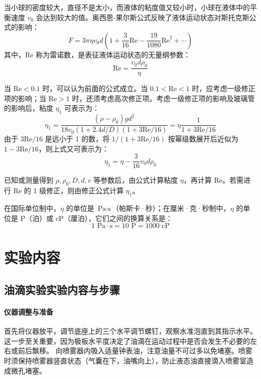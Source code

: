 \documentclass[11pt]{article}
\begin{document}
当小球的密度较大，直径不是太小，而液体的粘度值又较小时，小球在液体中的平衡速度 $v_0$ 会达到较大的值。奥西恩-果尔斯公式反映了液体运动状态对斯托克斯公式的影响：
\begin{equation}
    F = 3\pi\eta v_0 d \left( 1 + \frac{3}{16}\text{Re} - \frac{19}{1080}\text{Re}^2 + \cdots \right)
\end{equation}
其中，$\text{Re}$ 称为雷诺数，是表征液体运动状态的无量纲参数：
\begin{equation}
    \text{Re} = \frac{v_0 d \rho_0}{\eta}
\end{equation}

当 $\text{Re} < 0.1$ 时，可以认为前面的公式成立。当 $0.1 < \text{Re} < 1$ 时，应考虑一级修正项的影响；当 $\text{Re} > 1$ 时，还须考虑高次修正项。考虑一级修正项的影响及玻璃管的影响后，粘度 $\eta_1$ 可表示为：
\begin{equation}
    \eta_1 = \frac{(\rho - \rho_0)gd^2}{18v_0(1 + 2.4d/D)(1 + 3\text{Re}/16)} = \eta \frac{1}{1 + 3\text{Re}/16}
\end{equation}
由于 $3\text{Re}/16$ 是远小于 1 的数，将 $1 / (1 + 3\text{Re}/16)$ 按幂级数展开后近似为 $1 - 3\text{Re}/16$，则上式又可表示为：
\begin{equation}
    \eta_1 = \eta - \frac{3}{16}v_0 d \rho_0
\end{equation}

已知或测量得到 $\rho, \rho_0, D, d, v$ 等参数后，由公式计算粘度 $\eta$，再计算 $\text{Re}$。若需进行 $\text{Re}$ 的 1 级修正，则由修正公式计算 $\eta_1$。

在国际单位制中，$\eta$ 的单位是 $\text{Pa}\cdot\text{s}$（帕斯卡·秒）；在厘米·克·秒制中，$\eta$ 的单位是 $\text{P}$（泊）或 $\text{cP}$（厘泊），它们之间的换算关系是：
\[ 1\text{ Pa}\cdot\text{s} = 10\text{ P} = 1000\text{ cP} \]

\section{实验内容}
\subsection{油滴实验实验内容与步骤}

\paragraph{仪器调整与准备}
首先将仪器放平，调节底座上的三个水平调节螺钉，观察水准泡直到其指示水平。这一步至关重要，因为极板水平度决定了油滴在运动过程中是否会发生不必要的左右或前后飘移。
向喷雾器内吸入适量钟表油，注意油量不可过多以免堵塞。喷雾时须保持喷雾器竖直状态（气囊在下，油嘴向上），防止液态油直接滴入喷雾室造成微孔堵塞。
\end{document}

